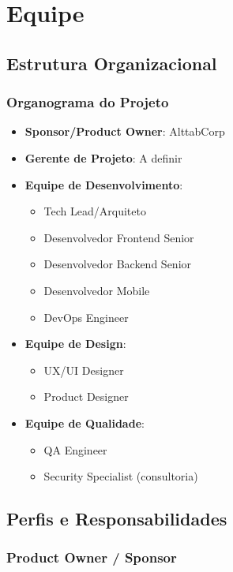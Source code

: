\section{Equipe}

\subsection{Estrutura Organizacional}

\subsubsection{Organograma do Projeto}

\begin{itemize}
    \item \textbf{Sponsor/Product Owner}: AlttabCorp
    \item \textbf{Gerente de Projeto}: A definir
    \item \textbf{Equipe de Desenvolvimento}:
    \begin{itemize}
        \item Tech Lead/Arquiteto
        \item Desenvolvedor Frontend Senior
        \item Desenvolvedor Backend Senior
        \item Desenvolvedor Mobile
        \item DevOps Engineer
    \end{itemize}
    \item \textbf{Equipe de Design}:
    \begin{itemize}
        \item UX/UI Designer
        \item Product Designer
    \end{itemize}
    \item \textbf{Equipe de Qualidade}:
    \begin{itemize}
        \item QA Engineer
        \item Security Specialist (consultoria)
    \end{itemize}
\end{itemize}

\subsection{Perfis e Responsabilidades}

\subsubsection{Product Owner / Sponsor}
